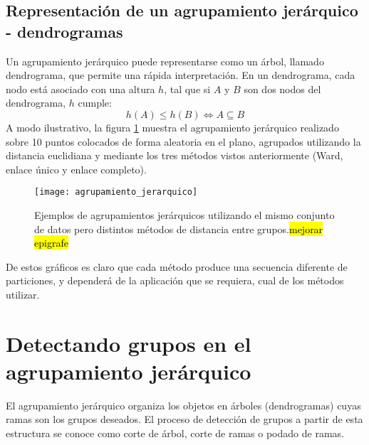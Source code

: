 \subsection{Representación de un agrupamiento jerárquico - dendrogramas}
Un agrupamiento jerárquico puede representarse como un árbol, llamado dendrograma, que permite una rápida interpretación. En un dendrograma, cada nodo está asociado con una altura $h$, tal que si $A$ y $B$ son dos nodos del dendrograma, $h$ cumple:
\begin{equation}
	h(A) \leq h(B) \Leftrightarrow A \subseteq B
\end{equation}
A modo ilustrativo, la figura \ref{fig:agrupamiento_jerarquico} muestra el agrupamiento jerárquico realizado sobre 10 puntos colocados de forma aleatoria en el plano, agrupados utilizando la distancia euclidiana y mediante los tres métodos vistos anteriormente (Ward, enlace único y enlace completo).
\begin{figure}[h]
    \centering
    \texttt{[image: agrupamiento\_jerarquico]}
    \caption{Ejemplos de agrupamientos jerárquicos utilizando el mismo conjunto de datos pero distintos métodos de distancia entre grupos.\hl{mejorar epigrafe}}
    \label{fig:agrupamiento_jerarquico}
\end{figure}
De estos gráficos es claro que cada método produce una secuencia diferente de particiones, y dependerá de la aplicación que se requiera, cual de los métodos utilizar.
\section{Detectando grupos en el agrupamiento jerárquico}
\label{sec:grupos_en_agrupamiento_jerarquico}
El agrupamiento jerárquico organiza los objetos en árboles (dendrogramas) cuyas ramas son los grupos deseados. El proceso de detección de grupos a partir de esta estructura se conoce como corte de árbol, corte de ramas o podado de ramas. 
